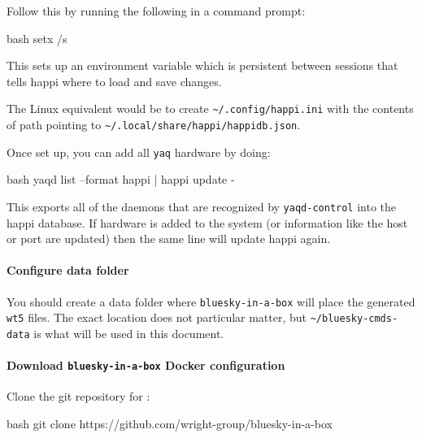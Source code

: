 
Follow this by running the following in a command prompt:

\begin{codefragment}{bash}
setx /s %
\end{codefragment}

This sets up an environment variable which is persistent between sessions that tells happi where to load and save changes.

The Linux equivalent would be to create \nolinkurl{~/.config/happi.ini} with the contents of path pointing to \nolinkurl{~/.local/share/happi/happidb.json}.

Once set up, you can add all \texttt{yaq} hardware by doing:

\begin{codefragment}{bash}
yaqd list --format happi | happi update -
\end{codefragment}

This exports all of the daemons that are recognized by \texttt{yaqd-control} into the happi database.
If hardware is added to the system (or information like the host or port are updated) then the same line will update happi again.

\paragraph{Configure data folder}

You should create a data folder where \texttt{bluesky-in-a-box} will place the generated \texttt{wt5} files.
The exact location does not particular matter, but \nolinkurl{~/bluesky-cmds-data} is what will be used in this document.

\paragraph{Download \texttt{bluesky-in-a-box} Docker configuration}

Clone the git repository for \biab:

\begin{codefragment}{bash}
git clone https://github.com/wright-group/bluesky-in-a-box
\end{codefragment}

